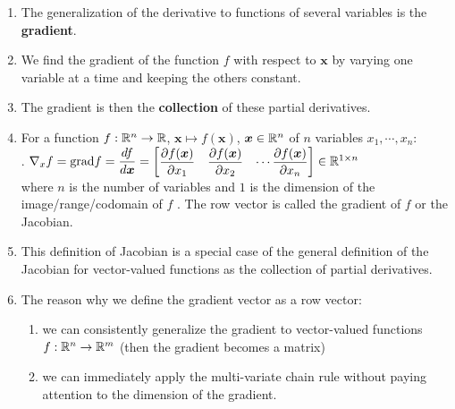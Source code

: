 \begin{enumerate}
    \item The generalization of the derivative to functions of several variables is the \textbf{gradient}.
    \hfill \cite{mfml/book/mml/Deisenroth-Faisal-Ong}

    \item We find the gradient of the function $f$ with respect to $\bm{x}$ by varying one variable at a time and keeping the others constant. 
    \hfill \cite{mfml/book/mml/Deisenroth-Faisal-Ong}
    
    \item The gradient is then the \textbf{collection} of these partial derivatives.
    \hfill \cite{mfml/book/mml/Deisenroth-Faisal-Ong}

    \item 
    \begin{definition}
        For a function $f : \mathbb{R}^n \to \mathbb{R}$, $\bm{x} \mapsto f (\bm{x})$, $\bm{x} \in \mathbb{R}^n$ of $n$ variables $x_1, \cdots , x_n$:
        \\
        .\hfill
        $
            \nabla_x f
            = \text{grad} f
            = \dfrac{df}{d\bm{x}}
            = \begin{bmatrix}
                \dfrac{\partial f(\bm{x})}{\partial x_1} &
                \dfrac{\partial f(\bm{x})}{\partial x_2} &
                \cdots
                \dfrac{\partial f(\bm{x})}{\partial x_n}
            \end{bmatrix}
            \in \mathbb{R}^{1 \times n}
        $
        \hfill \cite{mfml/book/mml/Deisenroth-Faisal-Ong}
        \\
        where $n$ is the number of variables and $1$ is the dimension of the image/range/codomain of $f$ .
        The row vector is called the gradient of $f$ or the Jacobian.
        \hfill \cite{mfml/book/mml/Deisenroth-Faisal-Ong}
    \end{definition}

    \item This definition of Jacobian is a special case of the general definition of the Jacobian for vector-valued functions as the collection of partial derivatives.
    \hfill \cite{mfml/book/mml/Deisenroth-Faisal-Ong}

    \item The reason why we define the gradient vector as a row vector:
    \hfill \cite{mfml/book/mml/Deisenroth-Faisal-Ong}
    \begin{enumerate}
        \item we can consistently generalize the gradient to vector-valued functions $f : \mathbb{R}^n \to \mathbb{R}^m$ (then the gradient becomes a matrix)
        \hfill \cite{mfml/book/mml/Deisenroth-Faisal-Ong}

        \item we can immediately apply the multi-variate chain rule without paying attention to the dimension of the gradient.
        \hfill \cite{mfml/book/mml/Deisenroth-Faisal-Ong}
    \end{enumerate}
\end{enumerate}






